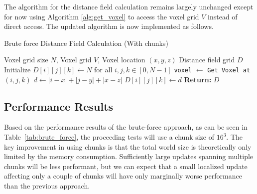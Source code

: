 The algorithm for the distance field calculation remains largely unchanged except for now using Algorithm
\ref{alg:get_voxel} to access the voxel grid \(V\) instead of direct access. The updated algorithm is now implemented
as follows.

\begin{algorithm}[H]
    \caption{Brute force Distance Field Calculation (With chunks)}
    \begin{algorithmic}[1]
        \REQUIRE Voxel grid size \(N\), Voxel grid \(V\), Voxel location \((x, y, z)\)
        \ENSURE Distance field grid \(D\)
        \STATE Initialize \(D[i][j][k] \gets N\) for all \(i, j, k \in [0, N-1]\)
        \STATE \texttt{voxel} $\gets$ \texttt{Get Voxel at} \((i, j, k)\)
        \STATE \(d \gets |i - x| + |j - y| + |x - z|\)
        \STATE \(D[i][j][k] \gets d\)
        \ENDIF
        \ENDIF
        \ENDFOR
        \ENDFOR
        \ENDFOR
        \STATE \textbf{Return:} \(D\)
    \end{algorithmic}
\end{algorithm}

\subsection{Performance Results}
Based on the performance results of the brute-force approach, as can be seen in Table~\ref{tab:brute_force}, the
proceeding tests will use a chunk size of \(16^3\). The key improvement in using chunks is that the total world size is
theoretically only limited by the memory consumption. Sufficiently large updates spanning multiple chunks will be less
performant, but we can expect that a small localized update affecting only a couple of chunks will have only marginally
worse performance than the previous approach.


